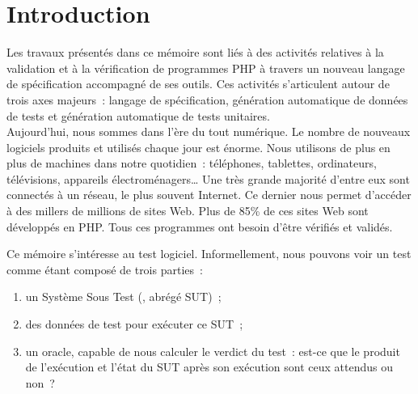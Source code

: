 \chapter{Introduction}
\label{chapter:introduction}

\minitoc

Les travaux présentés dans ce mémoire sont liés à des activités relatives à la
validation et à la vérification de programmes PHP à travers un nouveau langage
de spécification accompagné de ses outils. Ces activités s'articulent autour de
trois axes majeurs~: langage de spécification, génération automatique de données
de tests et génération automatique de tests unitaires. \\

Aujourd'hui, nous sommes dans l'ère du tout numérique. Le nombre de nouveaux
logiciels produits et utilisés chaque jour est énorme. Nous utilisons de plus en
plus de machines dans notre quotidien~: téléphones, tablettes, ordinateurs,
télévisions, appareils électroménagers… Une très grande majorité d'entre eux
sont connectés à un réseau, le plus souvent Internet. Ce dernier nous permet
d'accéder à des millers de millions de sites Web. Plus de 85\% de ces sites Web
sont développés en PHP. Tous ces programmes ont besoin d'être vérifiés et
validés.

Ce mémoire s'intéresse au test logiciel. Informellement, nous pouvons voir un
test comme étant composé de trois parties~:
%
\begin{enumerate}

\item un Système Sous Test (, abrégé {\strong
SUT})~;

\item des {\strong données de test} pour exécuter ce SUT~;

\item un {\strong oracle}, capable de nous calculer le verdict du test~: est-ce
que le produit de l'exécution et l'état du SUT après son exécution sont ceux
attendus ou non~?

\end{enumerate}

